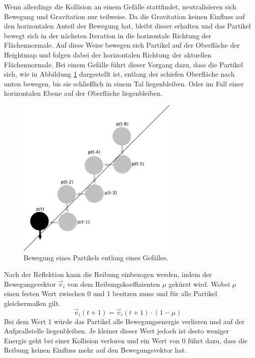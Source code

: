 \begin{Spacing}{\mylinespace}
		Wenn allerdings die Kollision an einem Gefälle stattfindet, neutralisieren
		sich Bewegung und Gravitation nur teilweise. Da die Gravitation keinen
		Einfluss auf den horizontalen Anteil der Bewegung hat, bleibt dieser
		erhalten und das Partikel bewegt sich in der nächsten Iteration in die
		horizontale Richtung der Flächennormale.
		Auf diese Weise bewegen sich Partikel auf der Oberfläche der Heightmap
		und folgen dabei der horizontalen Richtung der aktuellen Flächennormale.
		Bei einem Gefälle führt dieser Vorgang dazu, dass die Partikel sich,
		wie in Abbildung \ref{fig:rolling} dargestellt ist,
		entlang der schiefen Oberfläche nach unten bewegen, bis sie schließlich
		in einem Tal liegenbleiben. Oder im Fall einer horizontalen Ebene auf der Oberfläche liegenbleiben.
		\begin{figure}[h!]
			\centering
			\vspace*{30px}
			\includegraphics[width=0.7\textwidth]{graphics/Phys_rolling.png}
			\caption{Bewegung eines Partikels entlang eines Gefälles.}
			\label{fig:rolling}
		\end{figure}


		Nach der Reflektion kann die Reibung einbezogen werden, indem der Bewegungsvektor
		$\vec{v}_{i}$ von dem Reibungskoeffizienten $\mu$ gekürzt wird. Wobei $\mu$
		einen festen Wert zwischen 0 und 1 besitzen muss und für alle Partikel gleichermaßen gilt.
		\[ \vec{v}_{i}(t+1) = \vec{v}_{i}(t+1) \cdot ( 1 - \mu ) \]
		Bei dem Wert 1 würde das Partikel alle Bewegungsenergie verlieren und auf der
		Aufprallstelle liegenbleiben. Je kleiner dieser Wert jedoch ist desto weniger
		Energie geht bei einer Kollision verloren und ein Wert von 0 führt dazu, dass
		die Reibung keinen Einfluss mehr auf den Bewegungsvektor hat.


\end{Spacing}
